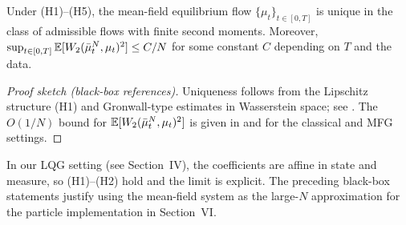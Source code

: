 \begin{proposition}\label{prop:mfg_limit_stability}
Under (H1)--(H5), the mean-field equilibrium flow $\{\mu_t\}_{t\in[0,T]}$ is unique in the class of admissible flows with finite second moments. Moreover, $\sup_{t\in[0,T]}\mathbb{E}[W_2(\bar\mu^N_t,\mu_t)^2] \le C/N$ for some constant $C$ depending on $T$ and the data.
\end{proposition}

\begin{proof}[Proof sketch (black-box references)]
Uniqueness follows from the Lipschitz structure (H1) and Gronwall-type estimates in Wasserstein space; see \cite{CarmonaDelarueMFGVol1}. The $O(1/N)$ bound for $\mathbb{E}[W_2(\bar\mu^N_t,\mu_t)^2]$ is given in \cite{FournierGuillin2015} and \cite{HuangMalhameCaines2006} for the classical and MFG settings.
\end{proof}

\begin{remark}
In our LQG setting (see Section~IV), the coefficients are affine in state and measure, so (H1)--(H2) hold and the limit is explicit. The preceding black-box statements justify using the mean-field system as the large-$N$ approximation for the particle implementation in Section~VI.
\end{remark}
